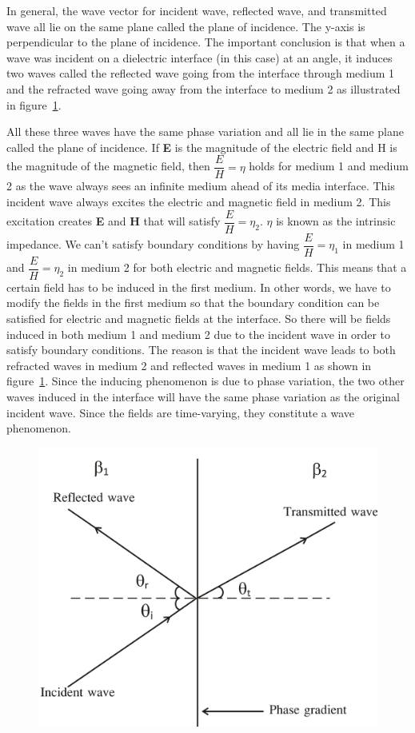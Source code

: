 In general, the wave vector for incident wave, reflected wave, and transmitted wave all lie on the same plane called the plane of incidence. The y-axis is perpendicular to the plane of incidence. The important conclusion is that when a wave was incident on a dielectric interface (in this case) at an angle, it induces two waves called the reflected wave going from the interface through medium 1  and the refracted wave going away from the interface to medium 2 as illustrated in figure~\ref{fig:group30e}.

All these three waves have the same phase variation and all lie in the same plane called the plane of incidence. If \textbf{E} is the magnitude of the electric field and H is the magnitude of the magnetic field, then $\dfrac{E}{H}=\eta$ holds for medium 1 and medium 2 as the wave always sees an infinite medium ahead of its media interface. This incident wave always excites the electric and magnetic field in medium 2. This excitation creates \textbf{E} and \textbf{H} that will satisfy $\dfrac{E}{H}=\eta_2$. $\eta$ is known as the intrinsic impedance. We can't satisfy boundary conditions by having $\dfrac{E}{H}=\eta_1$ in medium 1 and $\dfrac{E}{H}=\eta_2$ in medium 2 for both electric and magnetic fields. This means that a certain field has to be induced in the first medium. In other words, we have to modify the fields in the first medium so that the boundary condition can be satisfied for electric and magnetic fields at the interface. So there will be fields induced in both medium 1 and medium 2 due to the incident wave in order to satisfy boundary conditions. The reason is that the incident wave leads to both refracted waves in medium 2 and reflected waves in medium 1 as shown in figure~\ref{fig:group30e}. Since the inducing phenomenon is due to phase variation, the two other waves induced in the interface will have the same phase variation as the original incident wave. Since the fields are time-varying, they constitute a wave phenomenon.
\begin{figure}[h]
\centering
\includegraphics[width=.7\linewidth]{graphics/group30e}
\caption{}
\label{fig:group30e}
\end{figure}

